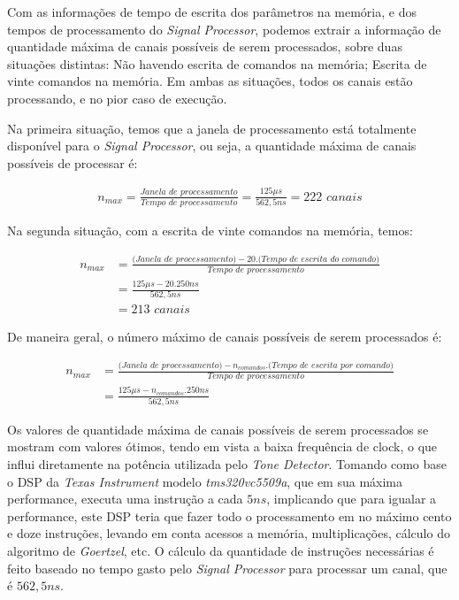 \documentclass[monografia]{subfiles}
\begin{document}
			Com as informações de tempo de escrita dos parâmetros na memória, e dos tempos de processamento do \textit{Signal Processor}, podemos extrair 
			a informação de quantidade máxima de canais possíveis de serem processados, sobre duas situações distintas: Não havendo escrita de comandos na memória;
			Escrita de vinte comandos na memória. Em ambas as situações, todos os canais estão processando, e no pior caso de execução.

			Na primeira situação, temos que a janela de processamento está totalmente disponível para o \textit{Signal Processor}, ou seja, a quantidade máxima
			de canais possíveis de processar é:

				\begin{align}
					n_{max} = \frac{\textit{Janela de processamento}}{\textit{Tempo de processamento}} =\frac{125\mu s}{562,5 ns} = 222 \textit{ canais}
				\end{align}

			Na segunda situação, com a escrita de vinte comandos na memória, temos:

			\begin{align}
					n_{max} &= \frac{\textit{(Janela de processamento)}-20.\textit{(Tempo de escrita do comando)} }{\textit{Tempo de processamento}} \\
						&=\frac{125\mu s - 20.250ns }{562,5 ns} \\
						&= 213 \textit{ canais}
			\end{align}

			De maneira geral, o número máximo de canais possíveis de serem processados é:


			\begin{align}
					n_{max} &= \frac{\textit{(Janela de processamento)}-n_{comandos}.\textit{(Tempo de escrita por comando)} }{\textit{Tempo de processamento}}\\
						&=\frac{125\mu s - n_{comandos}.250ns }{562,5 ns}
			\end{align}

			Os valores de quantidade máxima de canais possíveis de serem processados se mostram com valores ótimos, tendo em vista a baixa frequência de clock, 
			o que influi diretamente na potência utilizada pelo \textit{Tone Detector}. Tomando como base o DSP da \textit{Texas Instrument} modelo
			\textit{tms320vc5509a}, que em sua máxima performance, executa uma instrução a cada $5 ns$, implicando que para igualar a performance,
			este DSP teria que fazer todo o processamento em no máximo cento e doze instruções, levando em conta acessos a memória, multiplicações, cálculo do 
			algoritmo de \textit{Goertzel}, etc. O cálculo da quantidade de instruções necessárias é feito baseado no tempo gasto pelo \textit{Signal Processor}
			para processar um canal, que é $562,5ns$. 
\end{document}
